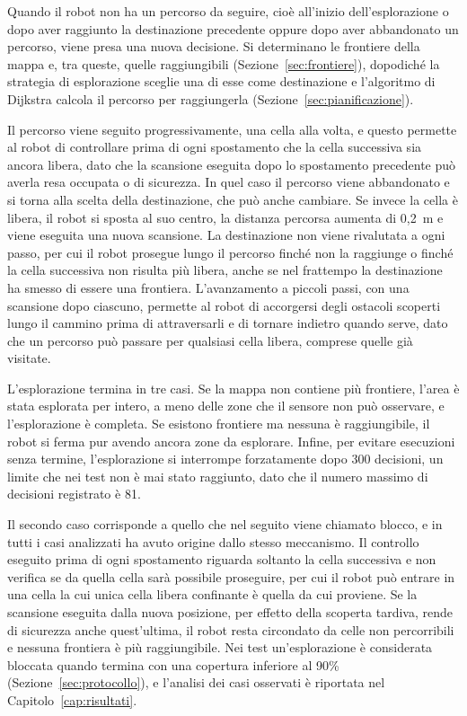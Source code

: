 Quando il robot non ha un percorso da seguire, cioè all'inizio dell'esplorazione o dopo aver raggiunto la destinazione precedente oppure dopo aver abbandonato un percorso, viene presa una nuova decisione. Si determinano le frontiere della mappa e, tra queste, quelle raggiungibili (Sezione~\ref{sec:frontiere}), dopodiché la strategia di esplorazione sceglie una di esse come destinazione e l'algoritmo di Dijkstra calcola il percorso per raggiungerla (Sezione~\ref{sec:pianificazione}).

Il percorso viene seguito progressivamente, una cella alla volta, e questo permette al robot di controllare prima di ogni spostamento che la cella successiva sia ancora libera, dato che la scansione eseguita dopo lo spostamento precedente può averla resa occupata o di sicurezza. In quel caso il percorso viene abbandonato e si torna alla scelta della destinazione, che può anche cambiare. Se invece la cella è libera, il robot si sposta al suo centro, la distanza percorsa aumenta di 0,2~m e viene eseguita una nuova scansione. La destinazione non viene rivalutata a ogni passo, per cui il robot prosegue lungo il percorso finché non la raggiunge o finché la cella successiva non risulta più libera, anche se nel frattempo la destinazione ha smesso di essere una frontiera. L'avanzamento a piccoli passi, con una scansione dopo ciascuno, permette al robot di accorgersi degli ostacoli scoperti lungo il cammino prima di attraversarli e di tornare indietro quando serve, dato che un percorso può passare per qualsiasi cella libera, comprese quelle già visitate.

L'esplorazione termina in tre casi. Se la mappa non contiene più frontiere, l'area è stata esplorata per intero, a meno delle zone che il sensore non può osservare, e l'esplorazione è completa. Se esistono frontiere ma nessuna è raggiungibile, il robot si ferma pur avendo ancora zone da esplorare. Infine, per evitare esecuzioni senza termine, l'esplorazione si interrompe forzatamente dopo 300 decisioni, un limite che nei test non è mai stato raggiunto, dato che il numero massimo di decisioni registrato è 81.

Il secondo caso corrisponde a quello che nel seguito viene chiamato blocco, e in tutti i casi analizzati ha avuto origine dallo stesso meccanismo. Il controllo eseguito prima di ogni spostamento riguarda soltanto la cella successiva e non verifica se da quella cella sarà possibile proseguire, per cui il robot può entrare in una cella la cui unica cella libera confinante è quella da cui proviene. Se la scansione eseguita dalla nuova posizione, per effetto della scoperta tardiva, rende di sicurezza anche quest'ultima, il robot resta circondato da celle non percorribili e nessuna frontiera è più raggiungibile. Nei test un'esplorazione è considerata bloccata quando termina con una copertura inferiore al 90\% (Sezione~\ref{sec:protocollo}), e l'analisi dei casi osservati è riportata nel Capitolo~\ref{cap:risultati}.

